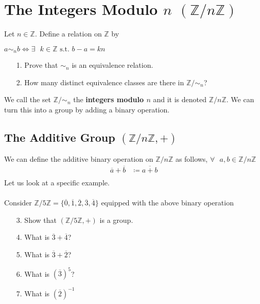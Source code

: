 \documentclass{article}
\begin{document}
\section{The Integers Modulo $n$ $(\mathbb{Z}/n\mathbb{Z})$}

Let $n\in\mathbb{Z}$. Define a relation on $\mathbb{Z}$ by
\begin{center}
  $a\sim_{n} b \iff \exists\text{ }k\in\mathbb{Z}\text{ s.t. }b-a = kn$
\end{center}

\begin{itemize}
\item [1.] Prove that $\sim_{n}$ is an equivalence relation.
\item [2.] How many distinct equivalence classes are there in $\mathbb{Z}/\sim_{n}$?
\end{itemize}

We call the set $\mathbb{Z}/\sim_{n}$  the \textbf{integers modulo $n$} and it is denoted $\mathbb{Z}/n\mathbb{Z}$.
We can turn this into a group by adding a binary operation.

\subsection{The Additive Group $(\mathbb{Z}/n\mathbb{Z}, +)$}

We can define the additive binary operation on $\mathbb{Z}/n\mathbb{Z}$ as follows, $\forall\text{ }a,b\in\mathbb{Z}/n\mathbb{Z}$
\begin{align*}
  \overline{a} + \overline{b} &\coloneq \overline{a+b}\\
\end{align*}
  Let us look at a specific example.
  \\\\Consider $\mathbb{Z}/5\mathbb{Z} = \{\overline{0}, \overline{1}, \overline{2}, \overline{3}, \overline{4}\}$ equipped with the above binary operation
  \begin{itemize}
  \item [3.] Show that $(\mathbb{Z}/5\mathbb{Z}, +)$ is a group.
  \item [4.] What is $\overline{3} + \overline{4}$?
  \item [5.] What is $\overline{3} + \overline{2}$?
  \item [6.] What is $(\overline{3})^5$?
  \item [7.] What is $(\overline{2})^{-1}$
  \end{itemize}
\end{document}
